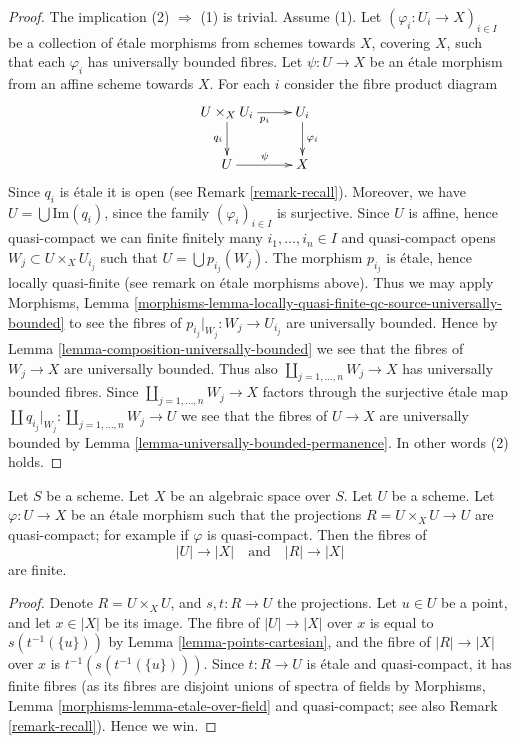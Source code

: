 \begin{proof}
The implication (2) $\Rightarrow$ (1) is trivial.
Assume (1). Let $(\varphi_i : U_i \to X)_{i \in I}$ be a collection of
\'etale morphisms from schemes towards $X$, covering $X$, such that
each $\varphi_i$ has universally bounded fibres.
Let $\psi : U \to X$ be an \'etale morphism from an affine scheme towards $X$.
For each $i$ consider the fibre product diagram
$$
\xymatrix{
U \times_X U_i \ar[r]_{p_i} \ar[d]_{q_i} & U_i \ar[d]^{\varphi_i} \\
U \ar[r]^\psi & X
}
$$
Since $q_i$ is \'etale it is open (see Remark \ref{remark-recall}).
Moreover, we have $U = \bigcup \text{Im}(q_i)$, since the family
$(\varphi_i)_{i \in I}$ is surjective. Since $U$ is affine, hence quasi-compact
we can finite finitely many $i_1, \ldots, i_n \in I$ and quasi-compact
opens $W_j \subset U \times_X U_{i_j}$ such that
$U = \bigcup p_{i_j}(W_j)$.
The morphism $p_{i_j}$ is \'etale, hence locally quasi-finite
(see remark on \'etale morphisms above). Thus we may apply
Morphisms, Lemma
\ref{morphisms-lemma-locally-quasi-finite-qc-source-universally-bounded}
to see the fibres of $p_{i_j}|_{W_j} : W_j \to U_{i_j}$ are universally
bounded. Hence by
Lemma \ref{lemma-composition-universally-bounded}
we see that the fibres of $W_j \to X$ are universally bounded.
Thus also $\coprod_{j = 1, \ldots, n} W_j \to X$ has universally
bounded fibres. Since $\coprod_{j = 1, \ldots, n} W_j \to X$ factors
through the surjective \'etale map
$\coprod q_{i_j}|_{W_j} : \coprod_{j = 1, \ldots, n} W_j \to U$ we
see that the fibres of $U \to X$ are universally bounded by
Lemma \ref{lemma-universally-bounded-permanence}.
In other words (2) holds.
\end{proof}

\begin{lemma}
\label{lemma-finite-fibres-presentation}
Let $S$ be a scheme.
Let $X$ be an algebraic space over $S$.
Let $U$ be a scheme. Let $\varphi : U \to X$ be an \'etale morphism such that
the projections $R = U \times_X U \to U$ are quasi-compact; for example if
$\varphi$ is quasi-compact. Then the fibres of
$$
|U| \to |X|
\quad\text{and}\quad
|R| \to |X|
$$
are finite.
\end{lemma}

\begin{proof}
Denote $R = U \times_X U$, and $s, t : R \to U$ the projections.
Let $u \in U$ be a point, and let $x \in |X|$ be its image.
The fibre of $|U| \to |X|$ over $x$ is equal to
$s(t^{-1}(\{u\}))$ by Lemma \ref{lemma-points-cartesian}, and
the fibre of $|R| \to |X|$ over $x$ is $t^{-1}(s(t^{-1}(\{u\})))$.
Since $t : R \to U$ is \'etale and quasi-compact, it has finite fibres
(as its fibres are disjoint unions of spectra of fields by
Morphisms, Lemma \ref{morphisms-lemma-etale-over-field}
and quasi-compact; see also Remark \ref{remark-recall}). Hence we win.
\end{proof}

